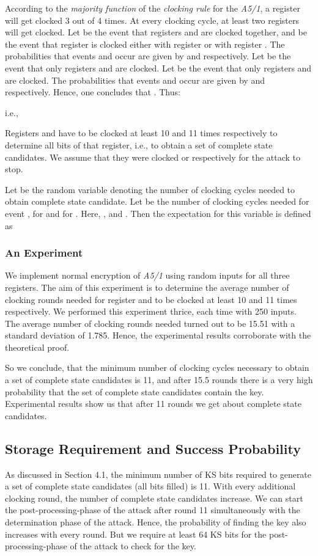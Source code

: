 \documentclass{llncs}
\begin{document}
According to the \emph{majority function} of the \emph{clocking rule} for the \emph{A5/1}, a register will get clocked 3 out of 4 times. At every clocking cycle, at least two registers will get clocked.
Let  be the event that registers  and  are clocked together, and  be the event that register  is clocked either with register  or with register . The probabilities that events  and  occur are given by  and  respectively. Let  be the event that only registers  and  are clocked. Let  be the event that only registers  and  are clocked. The probabilities that events  and  occur are given by  and  respectively. 
Hence, one concludes that . Thus:

i.e.,

Registers  and  have to be clocked at least 10 and 11 times respectively to determine all bits of that register, i.e., to obtain a set of complete state candidates. We assume that they were clocked  or  respectively for the attack to stop. 

Let  be the random variable denoting the number of clocking cycles needed to obtain complete state candidate. Let  be the number of clocking cycles needed for event ,  for  and  for . Here, ,  and . Then the expectation for this variable  is defined as

\subsubsection {An Experiment}
We implement normal encryption of \emph{A5/1} using random inputs for all three registers. The aim of this experiment is to determine the average number of clocking rounds needed for register  and  to be clocked at least 10 and 11 times respectively. We performed this experiment thrice, each time with 250 inputs. The average number of clocking rounds needed turned out to be 15.51 with a standard deviation of 1.785. Hence, the experimental results corroborate with the theoretical proof.

So we conclude, that the minimum number of clocking cycles necessary to obtain a set of complete state candidates is 11, and after 15.5 rounds there is a very high probability that the set of complete state candidates contain the key. Experimental results show us that after 11 rounds we get about  complete state candidates.

\subsection{Storage Requirement and Success Probability} 
As discussed in Section 4.1, the minimum number of KS bits required to generate a set of complete state candidates (all bits filled) is 11. With every additional clocking round, the number of complete state candidates increase. We can start the post-processing-phase of the attack after round 11 simultaneously with the determination phase of the attack. Hence, the probability of finding the key also increases with every round. But we require at least 64 KS bits for the post-processing-phase of the attack to check for the key.
\end{document}
